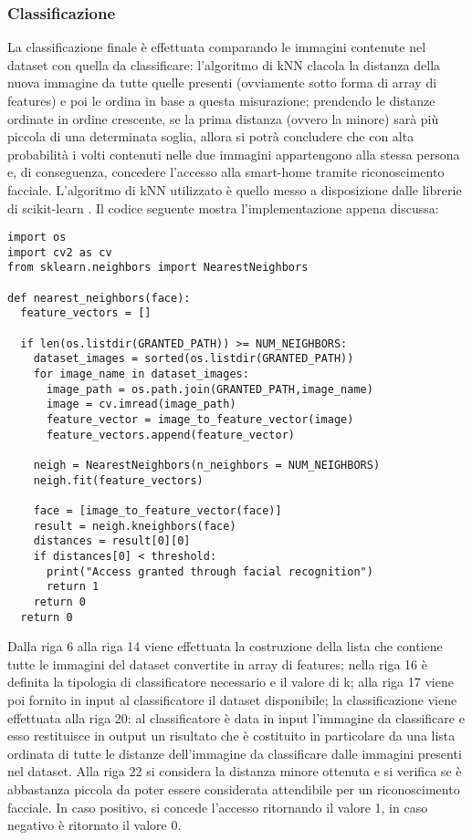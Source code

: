 \subsubsection{Classificazione}
La classificazione finale è effettuata comparando le immagini contenute nel dataset con quella da classificare: l'algoritmo di kNN clacola la distanza della nuova immagine da tutte quelle presenti (ovviamente sotto forma di array di features) e poi le ordina in base a questa misurazione; prendendo le distanze ordinate in ordine crescente, se la prima distanza (ovvero la minore) sarà più piccola di una determinata soglia, allora si potrà concludere che con alta probabilità i volti contenuti nelle due immagini appartengono alla stessa persona e, di conseguenza, concedere l'accesso alla smart-home tramite riconoscimento facciale. L'algoritmo di kNN utilizzato è quello messo a disposizione dalle librerie di scikit-learn \cite{scikit-learn}. Il codice seguente mostra l'implementazione appena discussa:
\begin{lstlisting}
import os
import cv2 as cv
from sklearn.neighbors import NearestNeighbors

def nearest_neighbors(face):
  feature_vectors = []

  if len(os.listdir(GRANTED_PATH)) >= NUM_NEIGHBORS:
    dataset_images = sorted(os.listdir(GRANTED_PATH))
    for image_name in dataset_images:
      image_path = os.path.join(GRANTED_PATH,image_name)
      image = cv.imread(image_path)
      feature_vector = image_to_feature_vector(image)
      feature_vectors.append(feature_vector)

    neigh = NearestNeighbors(n_neighbors = NUM_NEIGHBORS)
    neigh.fit(feature_vectors)

    face = [image_to_feature_vector(face)]
    result = neigh.kneighbors(face)
    distances = result[0][0]
    if distances[0] < threshold:
      print("Access granted through facial recognition")
      return 1
    return 0
  return 0
\end{lstlisting}
Dalla riga 6 alla riga 14 viene effettuata la costruzione della lista che contiene tutte le immagini del dataset convertite in array di features; nella riga 16 è definita la tipologia di classificatore necessario e il valore di k; alla riga 17 viene poi fornito in input al classificatore il dataset disponibile; la classificazione viene effettuata alla riga 20: al classificatore è data in input l'immagine da classificare e esso restituisce in output un risultato che è costituito in particolare da una lista ordinata di tutte le distanze dell'immagine da classificare dalle immagini presenti nel dataset. Alla riga 22 si considera la distanza minore ottenuta e si verifica se è abbastanza piccola da poter essere considerata attendibile per un riconoscimento facciale. In caso positivo, si concede l'accesso ritornando il valore 1, in caso negativo è ritornato il valore 0.


